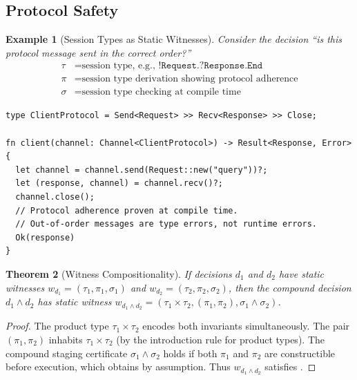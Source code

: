 \documentclass[11pt]{article}
\newtheorem{theorem}{Theorem}[section]
\newtheorem{example}[theorem]{Example}
\begin{document}
\subsection{Protocol Safety}

\begin{example}[Session Types as Static Witnesses]
\label{ex:protocol-safety}
Consider the decision ``is this protocol message sent in the correct order?''
\begin{align*}
  \tau &= \text{session type, e.g., } \texttt{!Request.?Response.End} \\
  \pi &= \text{session type derivation showing protocol adherence} \\
  \sigma &= \text{session type checking at compile time}
\end{align*}
\end{example}

\begin{lstlisting}[caption={Protocol safety through session types in JAPL}]
type ClientProtocol = Send<Request> >> Recv<Response> >> Close;

fn client(channel: Channel<ClientProtocol>) -> Result<Response, Error> {
  let channel = channel.send(Request::new("query"))?;
  let (response, channel) = channel.recv()?;
  channel.close();
  // Protocol adherence proven at compile time.
  // Out-of-order messages are type errors, not runtime errors.
  Ok(response)
}
\end{lstlisting}

\begin{theorem}[Witness Compositionality]
\label{thm:compositionality}
If decisions $d_1$ and $d_2$ have static witnesses $w_{d_1} = (\tau_1, \pi_1, \sigma_1)$
and $w_{d_2} = (\tau_2, \pi_2, \sigma_2)$, then the compound decision $d_1 \wedge d_2$
has static witness $w_{d_1 \wedge d_2} = (\tau_1 \times \tau_2, (\pi_1, \pi_2), \sigma_1 \wedge \sigma_2)$.
\end{theorem}

\begin{proof}
The product type $\tau_1 \times \tau_2$ encodes both invariants simultaneously. The
pair $(\pi_1, \pi_2)$ inhabits $\tau_1 \times \tau_2$ (by the introduction rule for
product types). The compound staging certificate $\sigma_1 \wedge \sigma_2$ holds if
both $\pi_1$ and $\pi_2$ are constructible before execution, which obtains by
assumption. Thus $w_{d_1 \wedge d_2}$ satisfies .
\end{proof}


\end{document}
